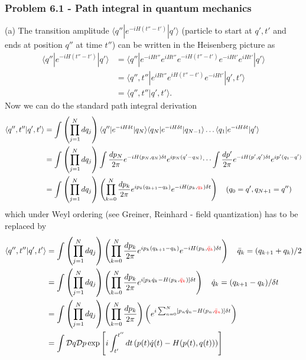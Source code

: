 \documentclass[10pt,a4paper]{book}
\theoremstyle{definition}
\begin{document}
\subsubsection{Problem 6.1 - Path integral in quantum mechanics}
(a) The transition amplitude $\langle q''|e^{-iH(t''-t')}|q'\rangle$ (particle to start at $q',t'$ and ends at position $q''$ at time $t''$) can be written in the Heisenberg picture as
\begin{align}
    \langle q''|e^{-iH(t''-t')}|q'\rangle
    &=\langle q''|e^{-iHt''}e^{iHt''}e^{-iH(t''-t')}e^{-iHt'}e^{iHt'}|q'\rangle\\
    &=\langle q'',t''|e^{iHt''}e^{iH(t''-t')}e^{-iHt'}|q',t'\rangle\\
    &=\langle q'',t''|q',t'\rangle.
\end{align}
Now we can do the standard path integral derivation
\begin{align}
    \langle q'',t''|q',t'\rangle
    &=\int\left(\prod_{j=1}^N dq_j\right) \langle q''|e^{-iH\delta t}|q_N\rangle \langle q_N|e^{-iH\delta t}|q_{N-1}\rangle \dots \langle q_1|e^{-iH\delta t}|q'\rangle\\
    &=\int\left(\prod_{j=1}^N dq_j\right) \int\frac{dp_N}{2\pi}e^{-iH(p_N,q_N)\delta t}e^{ip_N(q'-q_N)} \dots  \int\frac{dp'}{2\pi}e^{-iH(p',q')\delta t}e^{ip'(q_1-q')}\\
    &=\int\left(\prod_{j=1}^N dq_j\right)\left(\prod_{k=0}^{N}\frac{dp_k}{2\pi} e^{ip_k(q_{k+1}-q_k)}e^{-iH(p_k,\textcolor{red}{q_k})\delta t}\right)\quad(q_0=q',q_{N+1}=q'')
\end{align}
which under Weyl ordering (see Greiner, Reinhard - field quantization) has to be replaced by
\begin{align}
    \langle q'',t''|q',t'\rangle
    &=\int\left(\prod_{j=1}^N dq_j\right)\left(\prod_{k=0}^{N}\frac{dp_k}{2\pi} e^{ip_k(q_{k+1}-q_k)}e^{-iH(p_k,\textcolor{red}{\bar{q}_k})\delta t}\right)\quad \bar{q}_k=(q_{k+1}+q_k)/2\\
    &=\int\left(\prod_{j=1}^N dq_j\right)\left(\prod_{k=0}^{N}\frac{dp_k}{2\pi} e^{i[p_k\dot{q}_k-H(p_k,\textcolor{red}{\bar{q}_k})]\delta t}\right)\quad \dot{q}_k=(q_{k+1}-q_k)/{\delta t}\\
    &=\int\left(\prod_{j=1}^N dq_j\right)\left(\prod_{k=0}^{N}\frac{dp_k}{2\pi}\right) \left(e^{i\sum_{n=0}^N[p_n\dot{q}_n-H(p_n,\textcolor{red}{\bar{q}_n})]\delta t}\right)\\
    &=\int\mathcal{D}q\mathcal{D}p\exp\left[i\int_{t'}^{t''}dt\left(p(t)\dot{q}(t)-H(p(t),q(t))\right)\right]
\end{align}
\end{document}
